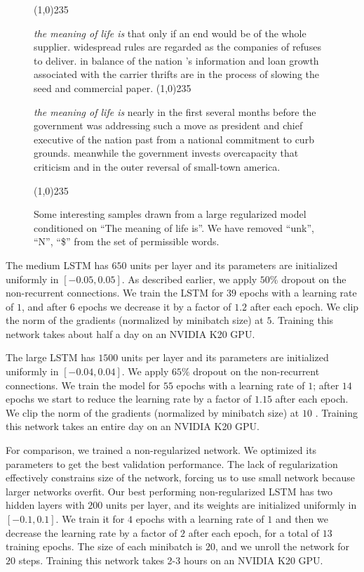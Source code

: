 \documentclass{article}
\begin{document}
\begin{figure}
\line(1,0){235}

  {\footnotesize
  \textit{the meaning of life is} that only if an end would be of the whole supplier. widespread rules are regarded as the companies of refuses to deliver. in balance of the nation 's information and loan growth associated with the carrier thrifts are in the process of slowing the seed and commercial paper.}
\line(1,0){235}

  {\footnotesize
\textit{the meaning of life is} nearly in the first several months before the government was addressing such a move as president and chief executive of the nation past from a national commitment to curb grounds. meanwhile the government invests overcapacity that criticism and in the outer reversal of small-town america.}

\line(1,0){235}
  \caption{Some interesting samples drawn from a large regularized model conditioned on ``The meaning of life is''. We have removed ``unk'', ``N'', ``\$'' from the set of permissible words.}
  \label{fig:meaning}
\end{figure}

The medium LSTM has $650$ units per layer
and its parameters are initialized uniformly in $[-0.05,
  0.05]$. As described earlier, we apply $50\%$ dropout on the non-recurrent connections. We
train the LSTM for $39$ epochs with a learning rate of $1$, and after
$6$ epochs we decrease it by a factor of $1.2$ after each epoch. We
clip the norm of the gradients (normalized by minibatch size) at $5$. 
Training this network takes about half a day on an NVIDIA K20 GPU. 

The large LSTM has $1500$ units per layer and its parameters are
initialized uniformly in $[-0.04, 0.04]$. We apply $65\%$ dropout on
the non-recurrent connections. We train the model for $55$ epochs with
a learning rate of $1$;  after $14$ epochs we start to reduce the learning rate by a
factor of $1.15$ after each epoch. We clip the norm of
the gradients (normalized by minibatch size) at $10$ \cite{mikolov2010recurrent}. Training this
network takes an entire day on an NVIDIA K20 GPU.

For comparison, we trained a non-regularized network. 
We optimized its parameters to get the best validation performance.
The lack of regularization
effectively constrains size of the network, forcing us to use small network because larger networks overfit. 
Our best performing non-regularized LSTM has two hidden layers with $200$ units per layer, and its weights are initialized
uniformly in $[-0.1, 0.1]$.
We train it for $4$ epochs 
with a learning rate of $1$ and then we decrease the learning rate by a factor of $2$ after each epoch, for a total of $13$ training epochs.
The size of each minibatch is $20$, and we unroll the network for $20$ steps. Training this network takes 2-3 hours
on an NVIDIA K20 GPU.
\end{document}

